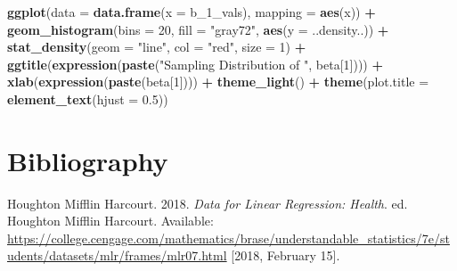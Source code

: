 \documentclass[12pt,]{article}
\newenvironment{Shaded}{\begin{snugshade}}{\end{snugshade}}
\newcommand{\KeywordTok}[1]{\textcolor[rgb]{0.13,0.29,0.53}{\textbf{#1}}}
\newcommand{\DataTypeTok}[1]{\textcolor[rgb]{0.13,0.29,0.53}{#1}}
\newcommand{\DecValTok}[1]{\textcolor[rgb]{0.00,0.00,0.81}{#1}}
\newcommand{\FloatTok}[1]{\textcolor[rgb]{0.00,0.00,0.81}{#1}}
\newcommand{\StringTok}[1]{\textcolor[rgb]{0.31,0.60,0.02}{#1}}
\newcommand{\OperatorTok}[1]{\textcolor[rgb]{0.81,0.36,0.00}{\textbf{#1}}}
\newcommand{\NormalTok}[1]{#1}
\begin{document}
\begin{Shaded}
\begin{Highlighting}[]
\KeywordTok{ggplot}\NormalTok{(}\DataTypeTok{data =} \KeywordTok{data.frame}\NormalTok{(}\DataTypeTok{x =}\NormalTok{ b_1_vals), }\DataTypeTok{mapping =} \KeywordTok{aes}\NormalTok{(x)) }\OperatorTok{+}\StringTok{ }\KeywordTok{geom_histogram}\NormalTok{(}\DataTypeTok{bins =} \DecValTok{20}\NormalTok{, }
    \DataTypeTok{fill =} \StringTok{"gray72"}\NormalTok{, }\KeywordTok{aes}\NormalTok{(}\DataTypeTok{y =}\NormalTok{ ..density..)) }\OperatorTok{+}\StringTok{ }\KeywordTok{stat_density}\NormalTok{(}\DataTypeTok{geom =} \StringTok{"line"}\NormalTok{, }\DataTypeTok{col =} \StringTok{"red"}\NormalTok{, }
    \DataTypeTok{size =} \DecValTok{1}\NormalTok{) }\OperatorTok{+}\StringTok{ }\KeywordTok{ggtitle}\NormalTok{(}\KeywordTok{expression}\NormalTok{(}\KeywordTok{paste}\NormalTok{(}\StringTok{"Sampling Distribution of "}\NormalTok{, beta[}\DecValTok{1}\NormalTok{]))) }\OperatorTok{+}\StringTok{ }
\StringTok{    }\KeywordTok{xlab}\NormalTok{(}\KeywordTok{expression}\NormalTok{(}\KeywordTok{paste}\NormalTok{(beta[}\DecValTok{1}\NormalTok{]))) }\OperatorTok{+}\StringTok{ }\KeywordTok{theme_light}\NormalTok{() }\OperatorTok{+}\StringTok{ }\KeywordTok{theme}\NormalTok{(}\DataTypeTok{plot.title =} \KeywordTok{element_text}\NormalTok{(}\DataTypeTok{hjust =} \FloatTok{0.5}\NormalTok{))}
\end{Highlighting}
\end{Shaded}

\section*{Bibliography}\label{bibliography}

\hypertarget{refs}{}
\hypertarget{ref-houghtonMifflin2018}{}
Houghton Mifflin Harcourt. 2018. \emph{Data for Linear Regression:
Health}. ed. Houghton Mifflin Harcourt. Available:
\url{https://college.cengage.com/mathematics/brase/understandable_statistics/7e/students/datasets/mlr/frames/mlr07.html}
{[}2018, February 15{]}.
\end{document}

